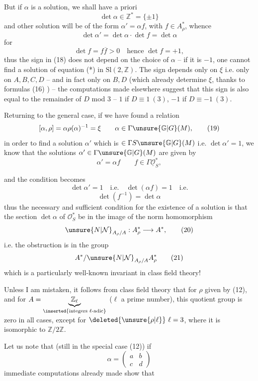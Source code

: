 

But if $\alpha$ is a solution, we shall have a priori
\[
\det\alpha\in\mathbb Z^*=\{\pm1\}
\tag{18}
\]
and  other solution will be of the form
$\alpha'=\alpha f$, with $f\in A_\rho^*$, whence
\[
\det\alpha'=\det\alpha\cdot\det f=\det\alpha
\]
for
\[
\det f=f\overline f>0\quad\text{hence }\det f=+1,
\]
thus the sign in (18)  does not depend
on the choice of $\alpha$ -- if it is $-1$, one cannot
find a solution of equation (*) in
$\mathrm{Sl}(2,\mathbb Z)$. The sign depends only on $\xi$ i.e. only
on $A,B,C,D$ -- and in fact  only on $B,D$
(which already determine $\xi$, thanks to
formulas (16) ) -- the computations made elsewhere
suggest that this sign is also  equal to the
remainder of $D$ mod 3 -- $1$ if $D\equiv1\ (3)$, $-1$ if
$D\equiv-1\ (3)$.

Returning to the general case, if we have found
a relation
\[
[\alpha,\rho]=\alpha\rho(\alpha)^{-1}=\xi
\qquad\alpha\in\Gamma\unsure{\mathbb G|G}(M),
\tag{19}
\]
in order  to find a solution $\alpha'$ which
is $\in\Gamma S\unsure{\mathbb G|G}(M)$ i.e. $\det\alpha'=1$, we know that
the solutions $\alpha'\in\Gamma\unsure{\mathbb G|G}(M)$  are given by
\[
\alpha'=\alpha f\qquad f\in\Gamma\underline{\mathcal O}_S^*,
\]



and the condition becomes
\[
\det\alpha'=1\quad\text{i.e.}\quad\det(\alpha f)=1\quad\text{i.e.}
\]
\[
\det(f^{-1})=\det\alpha
\]
thus the necessary and sufficient condition for the existence
of a solution is that the section $\det\alpha$ of
$\mathcal O_S^*$ be in the image of the norm
homomorphism
\[
\unsure{N|\mathcal N}_{A_\rho/A}:A_\rho^*\longrightarrow A^*,
\tag{20}
\]
i.e. the obstruction is in the group
\[
A^*/\unsure{N|\mathcal N}_{A_\rho/A}A_\rho^*
\tag{21}
\]
which is a particularly well-known invariant
in class field theory!

Unless I am mistaken, it follows from class field
theory that for $\rho$ given by (12),
and for $A=\underbrace{\mathbb Z_\ell}_{\inserted{\text{integers }\ell\text{-adic}}}$ ($\ell$ a prime number), this
quotient group is zero in all cases,
except for $\deleted{\unsure{\rho|\ell}}\ \ell=3$, where it is isomorphic to
$\mathbb Z/2\mathbb Z$. 

Let us note that (still in the special case (12))
if
\[
\alpha=\begin{pmatrix}a&b\\c&d\end{pmatrix}
\tag{22}
\]
immediate computations already made show that

